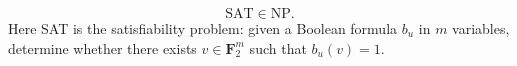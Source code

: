$$\text{SAT} \in \text{NP}.$$
Here SAT is the satisfiability problem: given a Boolean formula $b_u$ in $m$ variables, determine whether there exists $v \in \mathbf{F}_2^m$ such that $b_u(v) = 1$.

